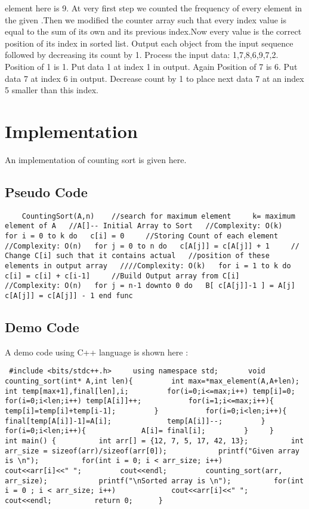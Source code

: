 element here is 9. At very first step we counted the frequency of every element in the given .Then we modified the counter array such that every index value is equal to the sum of its own and its previous index.Now every value is the correct position of its index in sorted list. Output each object from the input sequence followed by    decreasing its count by 1.   Process the input data: 1,7,8,6,9,7,2. Position of 1 is 1.   Put data 1 at index 1 in output. Again Position of 7 is 6.   Put data 7 at index 6 in output. Decrease count by 1 to place    next data 7 at an index 5 smaller than this index.      \section{Implementation}  An implementation of counting sort is given here.  \subsection{Pseudo Code} \begin{verbatim}    CountingSort(A,n)    //search for maximum element     k= maximum element of A   //A[]-- Initial Array to Sort   //Complexity: O(k)   for i = 0 to k do   c[i] = 0     //Storing Count of each element   //Complexity: O(n)   for j = 0 to n do   c[A[j]] = c[A[j]] + 1     // Change C[i] such that it contains actual   //position of these elements in output array   ////Complexity: O(k)   for i = 1 to k do   c[i] = c[i] + c[i-1]     //Build Output array from C[i]   //Complexity: O(n)   for j = n-1 downto 0 do   B[ c[A[j]]-1 ] = A[j]   c[A[j]] = c[A[j]] - 1 end func \end{verbatim}  \newpage  \subsection{Demo Code} A demo code using C++ language is shown here : \begin{verbatim} #include <bits/stdc++.h>     using namespace std;       void counting_sort(int* A,int len){         int max=*max_element(A,A+len);         int temp[max+1],final[len],i;         for(i=0;i<=max;i++) temp[i]=0;           for(i=0;i<len;i++) temp[A[i]]++;           for(i=1;i<=max;i++){             temp[i]=temp[i]+temp[i-1];         }           for(i=0;i<len;i++){             final[temp[A[i]]-1]=A[i];             temp[A[i]]--;         }         for(i=0;i<len;i++){             A[i]= final[i];         }     }      int main() {          int arr[] = {12, 7, 5, 17, 42, 13};          int arr_size = sizeof(arr)/sizeof(arr[0]);            printf("Given array is \n");          for(int i = 0; i < arr_size; i++)             cout<<arr[i]<<" ";         cout<<endl;         counting_sort(arr, arr_size);            printf("\nSorted array is \n");          for(int i = 0 ; i < arr_size; i++)             cout<<arr[i]<<" ";         cout<<endl;          return 0;      } \end{verbatim}  \newpage  